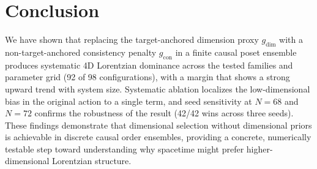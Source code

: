 \documentclass[11pt,a4paper]{article}
\begin{document}
\section{Conclusion}

We have shown that replacing the target-anchored dimension proxy $g_{\text{dim}}$ with a non-target-anchored consistency penalty $g_{\text{con}}$ in a finite causal poset ensemble produces systematic 4D Lorentzian dominance across the tested families and parameter grid (92 of 98 configurations), with a margin that shows a strong upward trend with system size. Systematic ablation localizes the low-dimensional bias in the original action to a single term, and seed sensitivity at $N = 68$ and $N = 72$ confirms the robustness of the result (42/42 wins across three seeds). These findings demonstrate that dimensional selection without dimensional priors is achievable in discrete causal order ensembles, providing a concrete, numerically testable step toward understanding why spacetime might prefer higher-dimensional Lorentzian structure.
\end{document}
